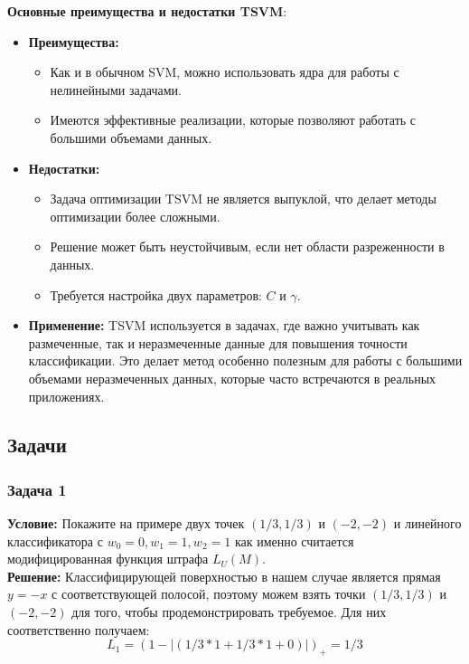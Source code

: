 \textbf{Основные преимущества и недостатки TSVM}:
\begin{itemize} 
    \item \textbf{Преимущества:}
          \begin{itemize} 
              \item Как и в обычном SVM, можно использовать ядра для работы с нелинейными задачами.
              \item Имеются эффективные реализации, которые позволяют работать с большими объемами данных.
          \end{itemize}
          
    \item \textbf{Недостатки:}
          \begin{itemize}
              \item Задача оптимизации TSVM не является выпуклой, что делает методы оптимизации более сложными.
              \item Решение может быть неустойчивым, если нет области разреженности в данных.
              \item Требуется настройка двух параметров: \( C \) и \( \gamma \).
          \end{itemize}
          
    \item \textbf{Применение:}
          TSVM используется в задачах, где важно учитывать как размеченные, так и неразмеченные данные для повышения точности классификации. Это делает метод особенно полезным для работы с большими объемами неразмеченных данных, которые часто встречаются в реальных приложениях.
\end{itemize}

\subsection{Задачи}
\subsubsection*{Задача 1}
\textbf{Условие:} Покажите на примере двух точек $(1/3, 1/3)$ и $(-2, -2)$ и линейного классификатора  с $w_0 = 0, w_1 = 1, w_2 = 1$ как именно считается модифицированная функция штрафа $L_U(M)$. \\
\textbf{Решение:}
Классифицирующей поверхностью в нашем случае является прямая $y = -x$ с соответствующей полосой, поэтому можем взять точки $(1/3, 1/3)$ и $(-2, -2)$ для того, чтобы продемонстрировать требуемое. Для них соответственно получаем:
\[
    L_1 = (1 - |(1/3*1 + 1/3*1 + 0)|)_+ = 1/3
\]

